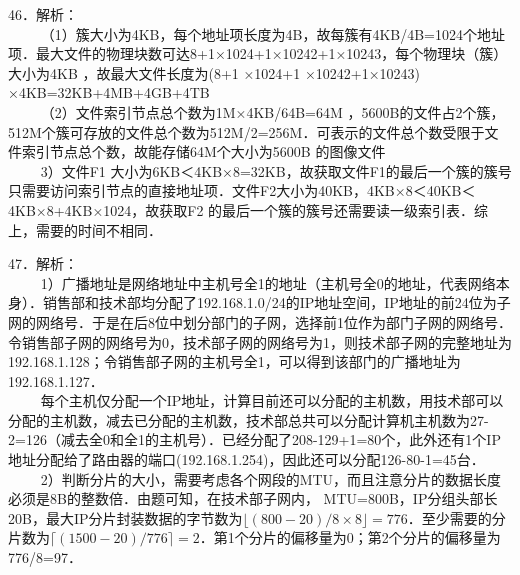 46．解析： \\
$\qquad$ （1）簇大小为4KB，每个地址项长度为4B，故每簇有4KB/4B=1024个地址项．最大文件的物理块数可达8+1×1024+1×10242+1×10243，每个物理块（簇）大小为4KB ，故最大文件长度为(8+1 ×1024+1 ×10242+1×10243) ×4KB=32KB+4MB+4GB+4TB \\
$\qquad$ （2）文件索引节点总个数为1M×4KB/64B=64M ，5600B的文件占2个簇， 512M个簇可存放的文件总个数为512M/2=256M．可表示的文件总个数受限于文件索引节点总个数，故能存储64M个大小为5600B 的图像文件 \\
$\qquad$ 3）文件F1 大小为6KB＜4KB×8=32KB，故获取文件F1的最后一个簇的簇号只需要访问索引节点的直接地址项．文件F2大小为40KB，4KB×8＜40KB＜4KB×8+4KB×1024，故获取F2 的最后一个簇的簇号还需要读一级索引表．综上，需要的时间不相同．

47．解析： \\
$\qquad$ 1）广播地址是网络地址中主机号全1的地址（主机号全0的地址，代表网络本身）．销售部和技术部均分配了192.168.1.0/24的IP地址空间，IP地址的前24位为子网的网络号．于是在后8位中划分部门的子网，选择前1位作为部门子网的网络号．令销售部子网的网络号为0，技术部子网的网络号为1，则技术部子网的完整地址为192.168.1.128；令销售部子网的主机号全1，可以得到该部门的广播地址为192.168.1.127． \\
$\qquad$ 每个主机仅分配一个IP地址，计算目前还可以分配的主机数，用技术部可以分配的主机数，减去已分配的主机数，技术部总共可以分配计算机主机数为27-2=126（减去全0和全1的主机号）．已经分配了208-129+1=80个，此外还有1个IP 地址分配给了路由器的端口(192.168.1.254)，因此还可以分配126-80-1=45台． \\
$\qquad$ 2）判断分片的大小，需要考虑各个网段的MTU，而且注意分片的数据长度必须是8B的整数倍．由题可知，在技术部子网内， MTU=800B，IP分组头部长20B，最大IP分片封装数据的字节数为$\lfloor(800-20)/8\times8\rfloor=776$．至少需要的分片数为$\lceil(1500-20)/776\rceil=2$．第1个分片的偏移量为0；第2个分片的偏移量为776/8=97．